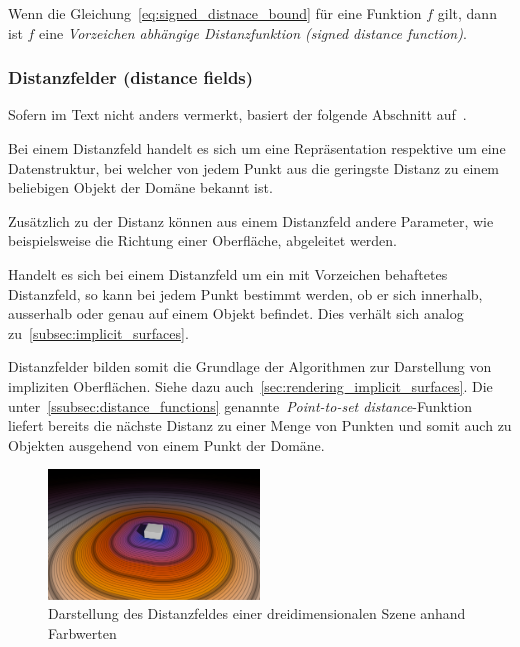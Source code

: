 Wenn die Gleichung~\ref{eq:signed_distnace_bound} für eine Funktion $f$
gilt, dann ist $f$ eine \textit{Vorzeichen abhängige Distanzfunktion
    (signed distance function)}.

\subsubsection{Distanzfelder (distance fields)}
\label{ssubsec:distance_fields}

Sofern im Text nicht anders vermerkt, basiert der folgende Abschnitt
auf~\cite{jones_3d_2006}.

Bei einem Distanzfeld handelt es sich um eine Repräsentation respektive
um eine Datenstruktur, bei welcher von jedem Punkt aus die geringste
Distanz zu einem beliebigen Objekt der Domäne bekannt ist.

Zusätzlich zu der Distanz können aus einem Distanzfeld andere Parameter,
wie beispielsweise die Richtung einer Oberfläche, abgeleitet werden.

Handelt es sich bei einem Distanzfeld um ein mit Vorzeichen behaftetes
Distanzfeld, so kann bei jedem Punkt bestimmt werden, ob er sich
innerhalb, ausserhalb oder genau auf einem Objekt befindet. Dies verhält
sich analog zu~\autoref{subsec:implicit_surfaces}.

Distanzfelder bilden somit die Grundlage der Algorithmen zur Darstellung
von impliziten Oberflächen. Siehe dazu
auch~\autoref{sec:rendering_implicit_surfaces}. Die
unter~\autoref{ssubsec:distance_functions} genannte~\textit{Point-to-set
    distance}-Funktion  liefert bereits die nächste Distanz zu einer
Menge von Punkten und somit auch zu Objekten ausgehend von einem Punkt
der Domäne.

\begin{figure}[H]
    \centering
    \includegraphics[width=0.5\textwidth]{img/distance_field.pdf}
    \caption{Darstellung des Distanzfeldes einer dreidimensionalen
        Szene anhand Farbwerten\protect\footnotemark}\label{
        fig:distance_field_illustration}
\end{figure}
